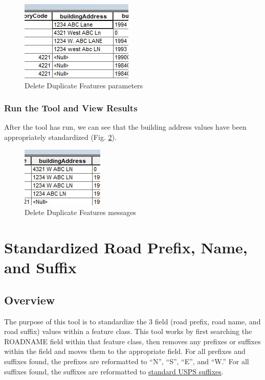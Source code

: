 \documentclass[openany]{book}
\theoremstyle{definition}
\theoremstyle{definition}
\theoremstyle{definition}
\theoremstyle{remark}
\begin{document}
\begin{figure}[H]

{\centering \includegraphics{figures/std1-before} 

}

\caption{Delete Duplicate Features parameters}\label{fig:std1before}
\end{figure}

\subsection{Run the Tool and View
Results}\label{run-the-tool-and-view-results-5}

After the tool has run, we can see that the building address values have
been appropriately standardized (Fig. \ref{fig:std1after}).

\begin{figure}[H]

{\centering \includegraphics{figures/std1-after} 

}

\caption{Delete Duplicate Features messages}\label{fig:std1after}
\end{figure}

\hypertarget{std3}{\chapter{Standardized Road Prefix, Name, and
Suffix}\label{std3}}

\section{Overview}\label{overview-6}

The purpose of this tool is to standardize the 3 field (road prefix,
road name, and road suffix) values within a feature class. This tool
works by first searching the ROADNAME field within that feature class,
then removes any prefixes or suffixes within the field and moves them to
the appropriate field. For all prefixes and suffixes found, the prefixes
are reformatted to ``N'', ``S'', ``E'', and ``W.'' For all suffixes
found, the suffixes are reformatted to
\href{https://github.com/allanbreyes/udacity-data-science/blob/master/p2/data/suffixes.csv}{standard
USPS suffixes}.
\end{document}
